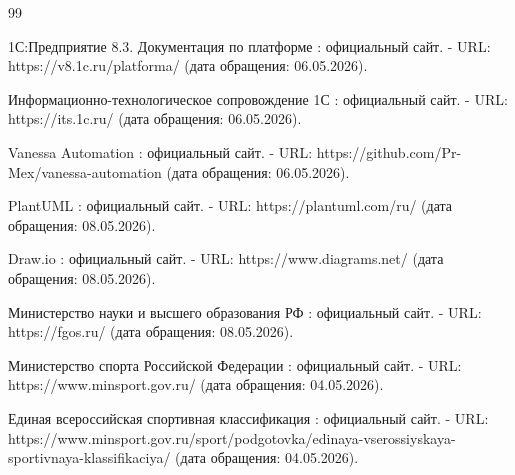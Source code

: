\begin{thebibliography}{99}
	
	
	
	
	
	
	 1С:Предприятие 8.3. Документация по платформе : официальный сайт. - URL: https://v8.1c.ru/platforma/ (дата обращения: 06.05.2026).
	
	 Информационно-технологическое сопровождение 1С : официальный сайт. - URL: https://its.1c.ru/ (дата обращения: 06.05.2026).
	
	 Vanessa Automation : официальный сайт. - URL: https://github.com/Pr-Mex/vanessa-automation (дата обращения: 06.05.2026).
	
	 PlantUML : официальный сайт. - URL: https://plantuml.com/ru/ (дата обращения: 08.05.2026).
	
	 Draw.io : официальный сайт. - URL: https://www.diagrams.net/ (дата обращения: 08.05.2026).
	
	 Министерство науки и высшего образования РФ : официальный сайт. - URL: https://fgos.ru/ (дата обращения: 08.05.2026).
	
	 Министерство спорта Российской Федерации : официальный сайт. - URL: https://www.minsport.gov.ru/ (дата обращения: 04.05.2026).
	
	 Единая всероссийская спортивная классификация : официальный сайт. - URL: https://www.minsport.gov.ru/sport/podgotovka/edinaya-vserossiyskaya-sportivnaya-klassifikaciya/ (дата обращения: 04.05.2026).
	
	
	
\end{thebibliography}